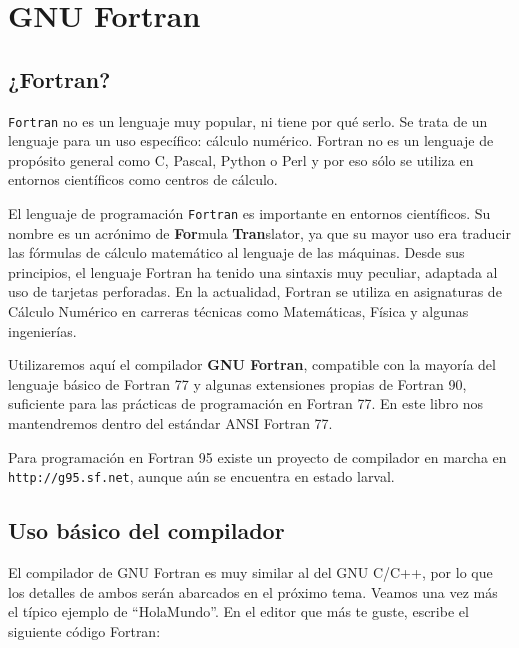
\chapter{GNU Fortran}
\label{gnufortran.tex}


\section{¿Fortran?}

{\tt Fortran} no  es un lenguaje muy popular, ni  tiene por qué serlo.
Se  trata de  un lenguaje  para un  uso específico:  cálculo numérico.
Fortran no es un lenguaje de  propósito general como C, Pascal, Python
o Perl y por eso sólo  se utiliza en entornos científicos como centros
de cálculo.

El lenguaje  de programación {\tt  Fortran} es importante  en entornos
científicos.  Su  nombre   es  un  acrónimo  de   {\bf  For}mula  {\bf
Tran}slator, ya que su mayor uso  era traducir las fórmulas de cálculo
matemático  al lenguaje  de  las máquinas.  Desde  sus principios,  el
lenguaje Fortran ha tenido una  sintaxis muy peculiar, adaptada al uso
de  tarjetas  perforadas. En  la  actualidad,  Fortran se  utiliza  en
asignaturas de Cálculo Numérico en carreras técnicas como Matemáticas,
Física y algunas ingenierías.

Utilizaremos aquí el  compilador {\bf GNU Fortran},  compatible con la
mayoría  del  lenguaje básico  de  Fortran  77 y  algunas  extensiones
propias de Fortran  90, suficiente para las  prácticas de programación
en Fortran 77. En este libro nos mantendremos dentro del estándar ANSI
Fortran 77.

Para programación  en Fortran 95  existe un proyecto de  compilador en
marcha en {\tt  http://g95.sf.net}, aunque aún se  encuentra en estado
larval.

\section{Uso básico del compilador}


El compilador de GNU  Fortran es muy similar al del  GNU C/C++, por lo
que los detalles  de ambos serán abarcados en el  próximo tema. Veamos
una vez más  el típico ejemplo de ``HolaMundo''. En  el editor que más
te guste, escribe el siguiente código Fortran:

